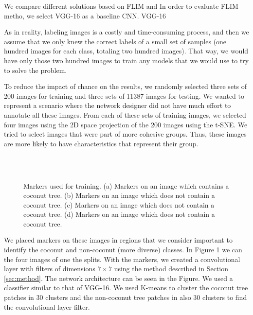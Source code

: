 \documentclass[a4paper,conference]{IEEEtran}
\begin{document}
We compare different solutions based on FLIM and In order to evaluate FLIM metho, we select VGG-16 as a baseline CNN. VGG-16

As in reality, labeling images is a costly and time-consuming process, and then we assume that we only knew the correct labels of a small set of samples (one hundred images for each class, totaling two hundred images). That way, we would have only those two hundred images to train any models that we would use to try to solve the problem.

To reduce the impact of chance on the results, we randomly selected three sets of 200 images for training and three sets of 11387 images for testing. We wanted to represent a scenario where the network designer did not have much effort to annotate all these images. From each of these sets of training images, we selected four images using the 2D space projection of the 200 images using the t-SNE. We tried to select images that were part of more cohesive groups. Thus, these images are more likely to have characteristics that represent their group.

\begin{figure}[!t]
    \centering
    ~
    \\
    ~
    \caption{Markers used for training. (a) Markers on an image which contains a coconut tree. (b) Markers on an image which does not contain a coconut tree. (c) Markers on an image which does not contain a coconut tree. (d) Markers on an image which does not contain a coconut tree.}
    \label{fig:markers}
\end{figure}

We placed markers on these images in regions that we consider important to identify the coconut and non-coconut (more diverse) classes. In Figure \ref{fig:markers} we can the four images of one the splits. With the markers, we created a convolutional layer with filters of dimensions $7 \times 7$ using the method described in Section \ref{sec:method}. The network architecture can be seen in the Figure. We used a classifier similar to that of VGG-16. We used K-means to cluster the coconut tree patches in 30 clusters and the non-coconut tree patches in also 30 clusters to find the convolutional layer filter. 
\end{document}
